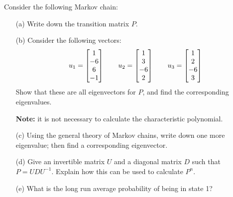 \documentclass[a4paper]{article}
\begin{document}
\begin{problem}[2012-13]
 Consider the following Markov chain:
 \begin{center}
 \end{center}
 \begin{itemize}
  \item[(a)] Write down the transition matrix $P$. 
  \item[(b)] Consider the following vectors:
   \[ u_1 = \left[\begin{matrix} 1 \\ -6 \\ 6 \\ -1 \end{matrix}\right] \qquad
      u_2 = \left[\begin{matrix} 1 \\ 3 \\ -6 \\ 2 \end{matrix}\right] \qquad
      u_3 = \left[\begin{matrix} 1 \\ 2 \\ -6 \\ 3 \end{matrix}\right]
   \]
   Show that these are all eigenvectors for $P$, and find the
   corresponding eigenvalues.\\  

   \textbf{Note:} it is not necessary to calculate the characteristic
   polynomial.
  \item[(c)] Using the general theory of Markov chains, write down one
   more eigenvalue; then find a corresponding eigenvector.  
  \item[(d)] Give an invertible matrix $U$ and a diagonal matrix $D$
   such that $P=UDU^{-1}$.  Explain how this can be used to calculate
   $P^n$. 
  \item[(e)] What is the long run average probability of being in
   state 1? 
 \end{itemize}
\end{problem}
\end{document}

